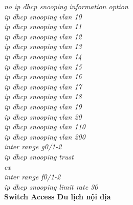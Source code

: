 \documentclass[a4paper, 12pt]{article}
\begin{document}
\hspace*{2cm}\textit{no ip dhcp snooping information option\\
\hspace*{2cm}ip dhcp snooping vlan 10\\
\hspace*{2cm}ip dhcp snooping vlan 11\\
\hspace*{2cm}ip dhcp snooping vlan 12\\
\hspace*{2cm}ip dhcp snooping vlan 13\\
\hspace*{2cm}ip dhcp snooping vlan 14\\
\hspace*{2cm}ip dhcp snooping vlan 15\\
\hspace*{2cm}ip dhcp snooping vlan 16\\
\hspace*{2cm}ip dhcp snooping vlan 17\\
\hspace*{2cm}ip dhcp snooping vlan 18\\
\hspace*{2cm}ip dhcp snooping vlan 19\\
\hspace*{2cm}ip dhcp snooping vlan 20\\
\hspace*{2cm}ip dhcp snooping vlan 110\\
\hspace*{2cm}ip dhcp snooping vlan 200\\
\hspace*{2cm}inter range g0/1-2\\
\hspace*{2cm}ip dhcp snooping trust\\
\hspace*{2cm}ex\\
\hspace*{2cm}inter range f0/1-2\\
\hspace*{2cm}ip dhcp snooping limit rate 30\\}
\hspace*{1cm}\textbf{Switch Access Du lịch nội địa}\\
\end{document}
